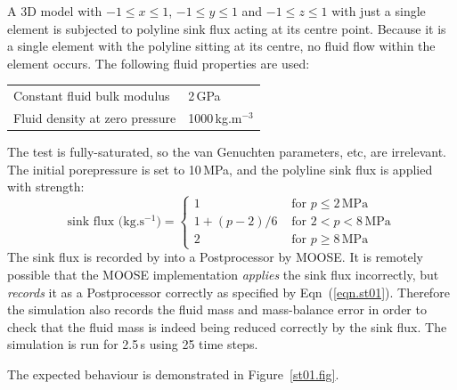 \documentclass[]{scrreprt}
\begin{document}
A 3D model with $-1\leq x \leq 1$, $-1\leq y \leq 1$ and $-1\leq z
\leq 1$ with just a
single element is subjected to polyline sink flux acting at its
centre point.  Because it is a single element with the polyline
sitting at its centre, no fluid flow within the
element occurs.  The following fluid properties are used:
\begin{center}
\begin{tabular}{|ll|}
\hline
Constant fluid bulk modulus & 2\,GPa \\
Fluid density at zero pressure & 1000\,kg.m$^{-3}$ \\
\hline
\end{tabular} 
\end{center}
The test is fully-saturated, so the van Genuchten parameters, etc, are
irrelevant.  The initial porepressure is set to 10\,MPa, and the
polyline sink flux is applied with strength:
\begin{equation}
\mbox{sink flux (kg.s$^{-1}$)} = \left\{
\begin{array}{ll}
1 & \mbox{ for } p \leq 2\,\mbox{MPa} \\
1 + (p - 2)/6 & \mbox{ for } 2<p<8\,\mbox{MPa} \\
2 & \mbox{ for } p\geq 8\,\mbox{MPa}
\end{array}
\right.
\label{eqn.st01}
\end{equation}
The sink flux is recorded by into a Postprocessor by MOOSE.  It is
remotely possible that the MOOSE implementation {\em applies} the sink
flux incorrectly, but {\em records} it as a Postprocessor correctly as
specified by Eqn~(\ref{eqn.st01}).  Therefore the simulation also
records the fluid mass and mass-balance error in order to check that
the fluid mass is indeed being reduced correctly by the sink flux.
The simulation is run for 2.5\,s using 25 time steps.

The expected behaviour is demonstrated in Figure~\ref{st01.fig}.
\end{document}
